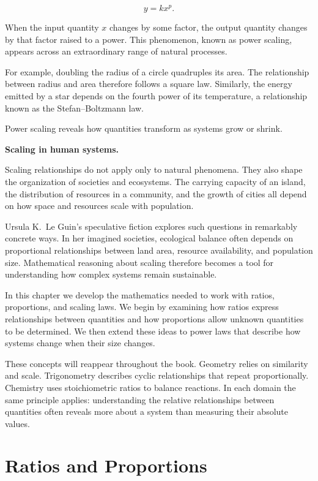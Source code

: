 \documentclass[11pt, openany]{book}
\theoremstyle{plain}
\theoremstyle{definition}
\theoremstyle{remark}
\begin{document}
\[
y = kx^p .
\]

When the input quantity $x$ changes by some factor, the output quantity
changes by that factor raised to a power. This phenomenon, known as
power scaling, appears across an extraordinary range of natural
processes.

For example, doubling the radius of a circle quadruples its area. The
relationship between radius and area therefore follows a square law.
Similarly, the energy emitted by a star depends on the fourth power of
its temperature, a relationship known as the Stefan–Boltzmann law.

Power scaling reveals how quantities transform as systems grow or
shrink.

\medskip

\textbf{Scaling in human systems.}

Scaling relationships do not apply only to natural phenomena. They also
shape the organization of societies and ecosystems. The carrying
capacity of an island, the distribution of resources in a community, and
the growth of cities all depend on how space and resources scale with
population.

Ursula K.~Le Guin's speculative fiction explores such questions in
remarkably concrete ways. In her imagined societies, ecological balance
often depends on proportional relationships between land area, resource
availability, and population size. Mathematical reasoning about scaling
therefore becomes a tool for understanding how complex systems remain
sustainable.

\medskip

In this chapter we develop the mathematics needed to work with ratios,
proportions, and scaling laws. We begin by examining how ratios express
relationships between quantities and how proportions allow unknown
quantities to be determined. We then extend these ideas to power laws
that describe how systems change when their size changes.

These concepts will reappear throughout the book. Geometry relies on
similarity and scale. Trigonometry describes cyclic relationships that
repeat proportionally. Chemistry uses stoichiometric ratios to balance
reactions. In each domain the same principle applies: understanding the
relative relationships between quantities often reveals more about a
system than measuring their absolute values.

\section{Ratios and Proportions}
\end{document}
